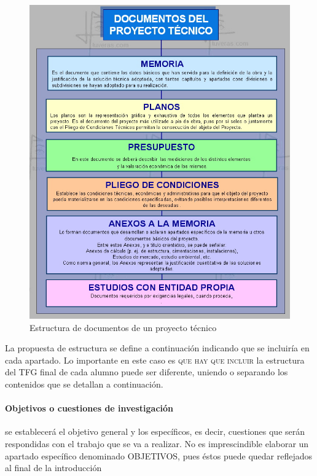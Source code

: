 \begin{figure}  
 	\begin{center}
        \includegraphics[scale = 0.45]{Figures/documentos.jpg}
        	\end{center}
        \caption{Estructura de documentos de un proyecto técnico}
    \label{fig:report}
\end{figure}


La propuesta de estructura se define a continuación indicando que se incluiría en cada apartado. Lo importante en este caso es \textsc{que hay que incluir} la estructura del TFG final de cada alumno puede ser diferente, uniendo o separando los contenidos que se detallan a continuación. 

\paragraph{Objetivos o cuestiones de investigación}

se establecerá el objetivo general y los específicos, es decir, cuestiones que serán respondidas con el trabajo que se va a realizar. No es
imprescindible elaborar un apartado específico denominado OBJETIVOS, pues éstos puede quedar reflejados al final de la
introducción

